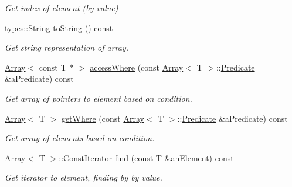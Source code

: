 \begin{DoxyCompactItemize}
\begin{DoxyCompactList}\small\item\em Get index of element (by value) \end{DoxyCompactList}\item 
\mbox{\hyperlink{classlibrary_1_1core_1_1types_1_1_string}{types\+::\+String}} \mbox{\hyperlink{classlibrary_1_1core_1_1ctnr_1_1_array_a90622afd5860fedd7d04e6518c096ffa}{to\+String}} () const
\begin{DoxyCompactList}\small\item\em Get string representation of array. \end{DoxyCompactList}\item 
\mbox{\hyperlink{classlibrary_1_1core_1_1ctnr_1_1_array}{Array}}$<$ const T $\ast$ $>$ \mbox{\hyperlink{classlibrary_1_1core_1_1ctnr_1_1_array_a5359c59d344a6147c7c6ea1012411011}{access\+Where}} (const \mbox{\hyperlink{classlibrary_1_1core_1_1ctnr_1_1_array}{Array}}$<$ T $>$\+::\mbox{\hyperlink{classlibrary_1_1core_1_1ctnr_1_1_array_a74cd325a740870aea490b6b739aa06ae}{Predicate}} \&a\+Predicate) const
\begin{DoxyCompactList}\small\item\em Get array of pointers to element based on condition. \end{DoxyCompactList}\item 
\mbox{\hyperlink{classlibrary_1_1core_1_1ctnr_1_1_array}{Array}}$<$ T $>$ \mbox{\hyperlink{classlibrary_1_1core_1_1ctnr_1_1_array_a62069b24d593b2265422cb8f3a149c44}{get\+Where}} (const \mbox{\hyperlink{classlibrary_1_1core_1_1ctnr_1_1_array}{Array}}$<$ T $>$\+::\mbox{\hyperlink{classlibrary_1_1core_1_1ctnr_1_1_array_a74cd325a740870aea490b6b739aa06ae}{Predicate}} \&a\+Predicate) const
\begin{DoxyCompactList}\small\item\em Get array of elements based on condition. \end{DoxyCompactList}\item 
\mbox{\hyperlink{classlibrary_1_1core_1_1ctnr_1_1_array}{Array}}$<$ T $>$\+::\mbox{\hyperlink{classlibrary_1_1core_1_1ctnr_1_1_array_ac26454f2a2ad4013873386a70aa25fc4}{Const\+Iterator}} \mbox{\hyperlink{classlibrary_1_1core_1_1ctnr_1_1_array_aeb8ed38b67b6031e27c188d89bd5cbbf}{find}} (const T \&an\+Element) const
\begin{DoxyCompactList}\small\item\em Get iterator to element, finding by by value. \end{DoxyCompactList}\item 

\end{DoxyCompactItemize}
